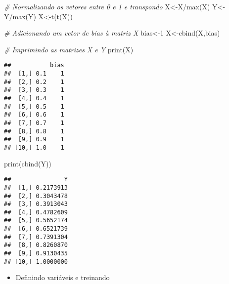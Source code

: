 \documentclass[
]{article}
\newenvironment{Shaded}{\begin{snugshade}}{\end{snugshade}}
\newcommand{\CommentTok}[1]{\textcolor[rgb]{0.56,0.35,0.01}{\textit{#1}}}
\newcommand{\DecValTok}[1]{\textcolor[rgb]{0.00,0.00,0.81}{#1}}
\newcommand{\FunctionTok}[1]{\textcolor[rgb]{0.00,0.00,0.00}{#1}}
\newcommand{\NormalTok}[1]{#1}
\newcommand{\OtherTok}[1]{\textcolor[rgb]{0.56,0.35,0.01}{#1}}
\newcommand{\SpecialCharTok}[1]{\textcolor[rgb]{0.00,0.00,0.00}{#1}}
\providecommand{\tightlist}{%
  \setlength{\itemsep}{0pt}\setlength{\parskip}{0pt}}
\begin{document}
\begin{Shaded}
\begin{Highlighting}[]
\CommentTok{\# Normalizando os vetores entre 0 e 1 e transpondo}
\NormalTok{X}\OtherTok{\textless{}{-}}\NormalTok{X}\SpecialCharTok{/}\FunctionTok{max}\NormalTok{(X)}
\NormalTok{Y}\OtherTok{\textless{}{-}}\NormalTok{Y}\SpecialCharTok{/}\FunctionTok{max}\NormalTok{(Y)}
\NormalTok{X}\OtherTok{\textless{}{-}}\FunctionTok{t}\NormalTok{(}\FunctionTok{t}\NormalTok{(X))}

\CommentTok{\# Adicionando um vetor de bias à matriz X}
\NormalTok{bias}\OtherTok{\textless{}{-}}\DecValTok{1}
\NormalTok{X}\OtherTok{\textless{}{-}}\FunctionTok{cbind}\NormalTok{(X,bias)}

\CommentTok{\# Imprimindo as matrizes X e Y}
\FunctionTok{print}\NormalTok{(X)}
\end{Highlighting}
\end{Shaded}

\begin{verbatim}
##           bias
##  [1,] 0.1    1
##  [2,] 0.2    1
##  [3,] 0.3    1
##  [4,] 0.4    1
##  [5,] 0.5    1
##  [6,] 0.6    1
##  [7,] 0.7    1
##  [8,] 0.8    1
##  [9,] 0.9    1
## [10,] 1.0    1
\end{verbatim}

\begin{Shaded}
\begin{Highlighting}[]
\FunctionTok{print}\NormalTok{(}\FunctionTok{cbind}\NormalTok{(Y))}
\end{Highlighting}
\end{Shaded}

\begin{verbatim}
##               Y
##  [1,] 0.2173913
##  [2,] 0.3043478
##  [3,] 0.3913043
##  [4,] 0.4782609
##  [5,] 0.5652174
##  [6,] 0.6521739
##  [7,] 0.7391304
##  [8,] 0.8260870
##  [9,] 0.9130435
## [10,] 1.0000000
\end{verbatim}

\begin{itemize}
\tightlist
\item
  Definindo variáveis e treinando
\end{itemize}
\end{document}
